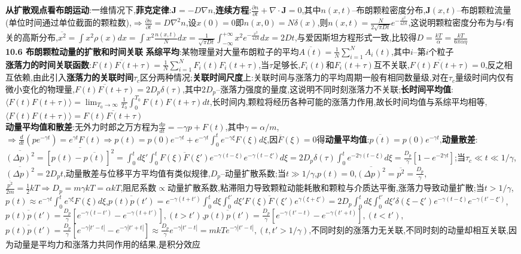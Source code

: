 \documentclass[10pt,a4paper]{article}
\begin{document}
\begin{multicols}{2}
\textbf{从扩散观点看布朗运动}:一维情况下,\textbf{菲克定律}:$\bm{J}=-D\nabla n$,\textbf{连续方程}:$\frac{\partial n}{\partial t}+\nabla\cdot\bm{J}=0$,其中$n(x,t)$--布朗颗粒密度分布,$\bm{J}(x,t)$--布朗颗粒流量(单位时间通过单位截面的颗粒数),$\Rightarrow\frac{\partial n}{\partial t}=D\nabla^2n$,设$x(0)=0$即$n(x,0)=N\delta(x)$,则$n(x,t)=\frac{N}{2\sqrt{\pi Dt}}e^{-\frac{x^2}{4Dt}}$,这说明颗粒密度分布为与$t$有关的高斯分布,$\overline{x^2}=\int x^2\rho(x)dx=\int x^2\frac{n(x,t)}{N}dx=\frac{1}{\sqrt{\pi Dt}}\int_{-\infty}^{+\infty}x^2e^{-\frac{x^2}{4Dt}}dx=2Dt$,与爱因斯坦方程形式一致,比较得$D=\frac{kT}{\alpha}=\frac{kT}{6\pi\alpha\eta}$\\
\textbf{10.6 布朗颗粒动量的扩散和时间关联}
\textbf{系综平均}:某物理量对大量布朗粒子的平均$\overline{A(t)}=\frac{1}{N}\sum_{i=1}^{N}A_i(t)$,其中$i$--第$i$个粒子\\
\textbf{涨落力的时间关联函数}:$\overline{F(t)F(t+\tau)}=\frac{1}{N}\sum_{i=1}^NF_i(t)F_i(t+\tau)$,当$\tau$足够长,$F_i(t)$和$F_i(t+\tau)$互不关联,$\overline{F(t)F(t+\tau)}=0$,反之相互依赖,由此引入\textbf{涨落力的关联时间}$\tau_c$区分两种情况;\textbf{关联时间尺度}上:关联时间与涨落力的平均周期一般有相同数量级,对在$\tau_c$量级时间内仅有微小变化的物理量,$\overline{F(t)F(t+\tau)}=2D_p\delta(\tau)$,其中$2D_p$--涨落力强度的量度,这说明不同时刻涨落力不关联;\textbf{长时间平均值}:$\langle F(t)F(t+\tau)\rangle=\lim_{T_0\rightarrow\infty}\frac{1}{T_0}\int_0^{T_0}F(t)F(t+\tau)dt$,长时间内,颗粒将经历各种可能的涨落力作用,故长时间均值与系综平均相等,$\langle F(t)F(t+\tau)\rangle=\overline{F(t)F(t+\tau)}$\\
\textbf{动量平均值和散差}:无外力时郎之万方程为$\frac{dp}{dt}=-\gamma p+F(t)$,其中$\gamma=\alpha/m$,$\Rightarrow\frac{d}{dt}(pe^{-\gamma t})=e^{\gamma t}F(t)\Rightarrow p(t)=p(0)e^{-\gamma t}+e^{-\gamma t}\int_0^te^{-\gamma\xi}F(\xi)d\xi$,因$\overline{F}(\xi)=0$得\textbf{动量平均值}:$\overline{p(t)}=p(0)e^{-\gamma t}$,\textbf{动量散差}:$\overline{(\Delta p)^2}=\overline{[p(t)-\overline{p(t)}]^2}=\int_0^td\xi'\int_0^t\overline{F(\xi)F(\xi')}e^{-\gamma(t-\xi)}e^{-\gamma(t-\xi')}d\xi=2D_p\delta(\tau)\int_0^te^{-2\gamma(t-\xi)}d\xi=\frac{D_p}{\gamma}[1-e^{-2\gamma t}]$;当$\tau_c\ll t\ll1/\gamma$,$\overline{(\Delta p)^2}=2D_pt$,动量散差与位移平方平均值有类似规律,$D_p$--动量扩散系数;当$t\gg1/\gamma$,$p(t)=0$,$\overline{(\Delta p)^2}=\overline{p^2}=\frac{D_p}{\gamma}$,$\frac{\overline{p^2}}{2m}=\frac{1}{2}kT\Rightarrow D_p=m\gamma kT=\alpha kT$,阻尼系数$\propto$动量扩散系数,粘滞阻力导致颗粒动能耗散和颗粒与介质达平衡,涨落力导致动量扩散;当$t>1/\gamma$,$p(t)\approx e^{-\gamma t}\int_0^te^{\gamma\xi}F(\xi)d\xi$,$\overline{p(t)p(t')}=e^{-\gamma(t+t')}\int_0^td\xi\int_0^{t'}d\xi'\overline{F(\xi)F(\xi')}e^{\gamma(\xi+\xi')}=2D_p\int_0^td\xi\int_0^{t'}d\xi'\delta(\xi-\xi')e^{-\gamma(t-\xi)}e^{-\gamma(t'-\xi')}$,$\overline{p(t)p(t')}=\frac{D_p}{\gamma}[e^{-\gamma(t-t')}-e^{-\gamma(t+t')}],(t>t')$,$\overline{p(t)p(t')}=\frac{D_p}{\gamma}[e^{-\gamma(t'-t)}-e^{-\gamma(t'+t)}],(t<t')$,$\overline{p(t)p(t')}=\frac{D_p}{\gamma}[e^{-\gamma|t'-t|}-e^{-\gamma|t'+t|}]\approx\frac{D_p}{\gamma}e^{-\gamma|t'-t|}=mkTe^{-\gamma|t'-t|},(t,t'>1/\gamma)$,不同时刻的涨落力无关联,不同时刻的动量却相互关联,因为动量是平均力和涨落力共同作用的结果,是积分效应\\

\end{multicols}
\end{document}
